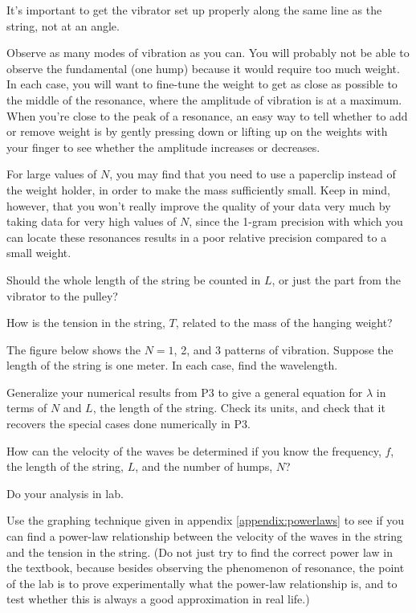 It's important to get the vibrator set up properly along the
same line as the string, not at an angle.

\observations

Observe as many modes of vibration as you can.  You will
probably not be able to observe the fundamental (one
hump) because it would require too much weight.  In each
case, you will want to fine-tune the weight to get as close
as possible to the middle of the resonance, where the
amplitude of vibration is at a maximum.  When you're close
to the peak of a resonance, an easy way to tell whether to
add or remove weight is by gently pressing down or lifting
up on the weights with your finger to see whether the
amplitude increases or decreases.

For large values of $N$, you may find that you need to use a
paperclip instead of the weight holder, in order to make the mass
sufficiently small. Keep in mind, however, that you won't really
improve the quality of your data very much by taking data for very
high values of $N$, since the 1-gram precision with which you can
locate these resonances results in a poor relative precision
compared to a small weight.

\prelab

\prelabquestion  Should the whole length of the string be counted in
$L$, or just the part from the vibrator to the pulley?

\prelabquestion  How is the tension in the string, $T$, related to the
mass of the hanging weight?

\prelabquestion The figure below shows the $N=1$, 2, and 3 patterns
of vibration. Suppose the length of the string is one meter. In each case,
find the wavelength.


\prelabquestion Generalize your numerical results from P3 to give a general
equation for $\lambda$ in terms of $N$ and $L$, the length of the string. Check its units, and check
that it recovers the special cases done numerically in P3.

\prelabquestion  How can the velocity of the waves be determined if you
know the frequency, $f$, the length of the string, $L$, and
the number of humps, $N$?

\selfcheck

Do your analysis in lab.

\analysis

Use the graphing technique given in appendix \ref{appendix:powerlaws} to see if you can
find a power-law relationship between the velocity of the
waves in the string and the tension in the string.  (Do not
just try to find the correct power law in the textbook,
because besides observing the phenomenon of resonance, the
point of the lab is to prove experimentally what the
power-law relationship is, and to test whether this is
always a good approximation in real life.)

